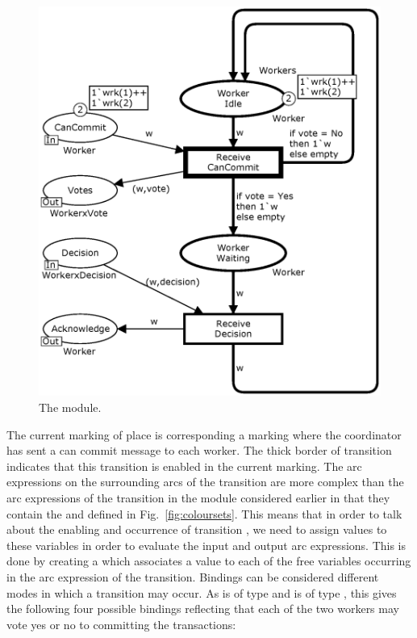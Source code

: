 \begin{figure}[]
\centering
\includegraphics[scale=.5]{figures/Worker.eps}
\caption{The  module.}
\label{fig:worker}
\end{figure}

The current marking of place  is  corresponding a marking where the coordinator has sent
a can commit message to each worker. The thick border of transition
 indicates that this transition is enabled
in the current marking. The arc expressions on the surrounding arcs
of the  transition are more complex than the
arc expressions of the  transition in the
 module considered earlier in that they contain
the   and  defined in
Fig.~\ref{fig:coloursets}. This means that in order to talk about the
enabling and occurrence of transition , we
need to assign values to these variables in order to evaluate the
input and output arc expressions. This is done by creating a
 which associates a value to each of the free
variables occurring in the arc expression of the transition. Bindings
can be considered different modes in which a transition may occur.  As
 is of type  and  is of type
, this gives the following four possible bindings
reflecting that each of the two workers may vote yes or no to
committing the transactions:

